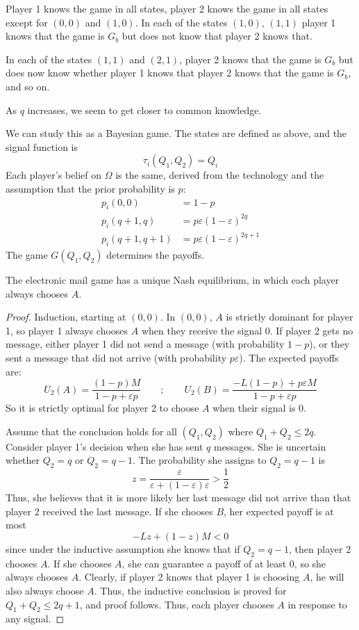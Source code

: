 \documentclass[10pt]{article}
\begin{document}
\begin{model}
	Player 1 knows the game in all states, player 2 knows the game in all states except for $(0,0)$ and $(1,0)$. In each of the states $(1,0)$, $(1,1)$ player 1 knows that the game is $G_b$ but does not know that player 2 knows that. 
	
	In each of the states $(1,1)$ and $(2,1)$, player 2 knows that the game is $G_b$ but does now know whether player 1 knows that player 2 knows that the game is $G_b$, and so on.
	
	As $q$ increases, we seem to get closer to common knowledge.
	
	We can study this as a Bayesian game. The states are defined as above, and the signal function is \[\tau_i(Q_1,Q_2) = Q_i\]Each player's belief on $\Omega$ is the same, derived from the technology and the assumption that the prior probability is $p$:\begin{align*} p_i(0,0) &= 1-p \\ p_i(q+1,q) &= p\varepsilon(1-\varepsilon)^{2q} \\ p_i(q+1,q+1) &= p\varepsilon(1-\varepsilon)^{2q+1}\end{align*}The game $G(Q_1,Q_2)$ determines the payoffs. 
\end{model}
\begin{proposition}
	The electronic mail game has a unique Nash equilibrium, in which each player always chooses $A$.
\end{proposition}
\begin{proof}
	Induction, starting at $(0,0)$. In $(0,0)$, $A$ is strictly dominant for player 1, so player 1 always chooses $A$ when they receive the signal $0$. If player 2 gets no message, either player 1 did not send a message (with probability $1-p$), or they sent a message that did not arrive (with probability $p\varepsilon$). The expected payoffs are:\[ U_2(A) = \frac{(1-p)M}{1-p+\varepsilon p} \qquad ;\qquad U_2(B) = \frac{-L(1-p) + p\varepsilon M}{1-p+\varepsilon p}\]So it is strictly optimal for player 2 to choose $A$ when their signal is $0$. 
	
	Assume that the conclusion holds for all $(Q_1,Q_2)$ where $Q_1 + Q_2 \le 2q$. Consider player 1's decision when she has sent $q$ messages. She is uncertain whether $Q_2 = q$ or $Q_2 = q-1$. The probability she assigns to $Q_2 = q-1$ is \[z = \frac{\varepsilon}{\varepsilon + (1-\varepsilon)\varepsilon} > \frac{1}{2}\]Thus, she believes that it is more likely her last message did not arrive than that player 2 received the last message. If she chooses $B$, her expected payoff is at most \[-Lz + (1-z)M < 0\]since under the inductive assumption she knows that if $Q_2 = q-1$, then player 2 chooses $A$. If she chooses $A$, she can guarantee a payoff of at least 0, so she always chooses $A$. Clearly, if player 2 knows that player 1 is choosing $A$, he will also always choose $A$. Thus, the inductive conclusion is proved for $Q_1 + Q_2 \le 2q+1$, and proof follows. Thus, each player chooses $A$ in response to any signal.
\end{proof}
\end{document}
